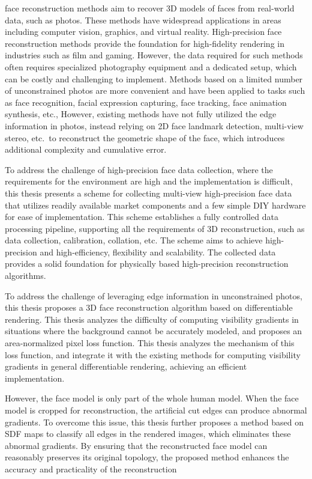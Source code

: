 \documentclass{scutmaster}
\newcommand{\changed}[1]{{\color{red}#1}}
\begin{document}
\changed{
face reconstruction methods aim to recover 3D models of faces from real-world data, such as photos.
These methods have widespread applications in areas including computer vision, graphics, and virtual reality.
High-precision face reconstruction methods provide the foundation for high-fidelity rendering in industries such as film and gaming.
However, the data required for such methods often requires specialized photography equipment and a dedicated setup,
which can be costly and challenging to implement.
Methods based on a limited number of unconstrained photos are more convenient and
have been applied to tasks such as face recognition, facial expression capturing, face tracking, face animation synthesis, etc.,
However, existing methods have not fully utilized the edge information in photos,
instead relying on 2D face landmark detection, multi-view stereo, etc.\ to reconstruct the geometric shape of the face,
which introduces additional complexity and cumulative error.

To address the challenge of high-precision face data collection,
where the requirements for the environment are high and the implementation is difficult,
this thesis presents a scheme for collecting multi-view high-precision face data
that utilizes readily available market components and a few simple DIY hardware for ease of implementation.
This scheme establishes a fully controlled data processing pipeline,
supporting all the requirements of 3D reconstruction, such as data collection, calibration, collation, etc.
The scheme aims to achieve high-precision and high-efficiency, flexibility and scalability.
The collected data provides a solid foundation for physically based high-precision reconstruction algorithms.
}

To address the challenge of leveraging edge information in unconstrained photos,
this thesis proposes a 3D face reconstruction algorithm based on differentiable rendering.
This thesis analyzes the difficulty  of computing visibility gradients in situations where the background cannot be accurately modeled,
and proposes an area-normalized pixel loss function.
This thesis analyzes the mechanism of this loss function,
and integrate it with the existing methods for computing visibility gradients in general differentiable rendering,
achieving an efficient implementation.

However, the face model is only part of the whole human model.
When the face model is cropped for reconstruction,
the artificial cut edges can produce abnormal gradients.
To overcome this issue, this thesis further proposes a method based on SDF maps to classify all edges in the rendered images,
which eliminates these abnormal gradients.
By ensuring that the reconstructed face model can reasonably preserves its original topology,
the proposed method enhances the accuracy and practicality of the reconstruction
\end{document}
